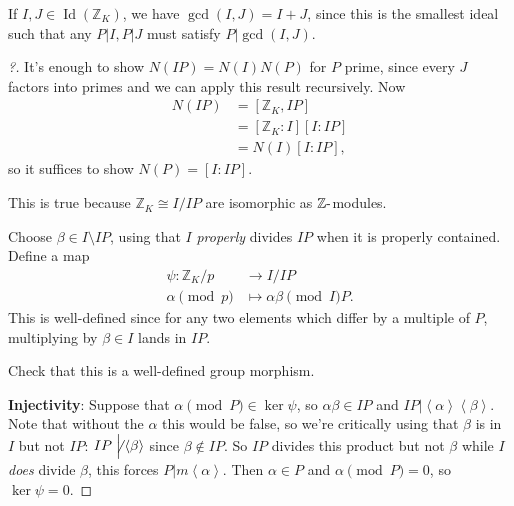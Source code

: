 \begin{remark}

If \(I, J\in \operatorname{Id}({\mathbb{Z}}_K)\), we have
\(\gcd(I, J) = I+J\), since this is the smallest ideal such that any
\(P\mathrel{\Big|}I, P\mathrel{\Big|}J\) must satisfy
\(P\mathrel{\Big|}\gcd(I, J)\).

\end{remark}

\begin{proof}[?]

It's enough to show \(N(IP) = N(I) N(P)\) for \(P\) prime, since every
\(J\) factors into primes and we can apply this result recursively. Now
\begin{align*}
N(IP) 
&= [{\mathbb{Z}}_K, IP] \\
&= [{\mathbb{Z}}_K: I] [I : IP] \\
&= N(I) [I: IP]
,\end{align*}
so it suffices to show \(N(P) = [I: IP]\).

\begin{claim}

This is true because \({\mathbb{Z}}_K \cong I/IP\) are isomorphic as
\({\mathbb{Z}}{\hbox{-}}\)modules.

\end{claim}

Choose \(\beta \in I\setminus IP\), using that \(I\) \emph{properly}
divides \(IP\) when it is properly contained. Define a map
\begin{align*}
\psi: {\mathbb{Z}}_K/p &\to I/IP \\
\alpha \pmod p  &\mapsto \alpha \beta \pmod IP
.\end{align*}
This is well-defined since for any two elements which differ by a
multiple of \(P\), multiplying by \(\beta \in I\) lands in \(IP\).

\begin{exercise}[?]

Check that this is a well-defined group morphism.

\end{exercise}

\textbf{Injectivity}: Suppose that \(\alpha\pmod P \in \ker \psi\), so
\(\alpha \beta\in IP\) and
\(IP \mathrel{\Big|}\left\langle{ \alpha }\right\rangle \left\langle{ \beta }\right\rangle\).
Note that without the \(\alpha\) this would be false, so we're
critically using that \(\beta\) is in \(I\) but not \(IP\):
\(IP\not\mathrel{\Big|}\left\langle{ \beta }\right\rangle\) since
\(\beta \not\in IP\). So \(IP\) divides this product but not \(\beta\)
while \(I\) \emph{does} divide \(\beta\), this forces
\(P\mathrel{\Big|}m \left\langle{ \alpha }\right\rangle\). Then
\(\alpha\in P\) and \(\alpha\pmod P = 0\), so \(\ker \psi = 0\).


\end{proof}
